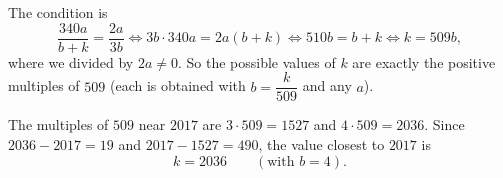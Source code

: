 The condition is
\[
\dfrac{340a}{b+k}=\dfrac{2a}{3b}\iff 3b\cdot340a=2a(b+k)\iff 510b=b+k\iff k=509b,
\]
where we divided by $2a\ne0$. So the possible values of $k$ are exactly the positive multiples of $509$ (each is obtained with $b=\dfrac{k}{509}$ and any $a$).

The multiples of $509$ near $2017$ are $3\cdot509=1527$ and $4\cdot509=2036$. Since $2036-2017=19$ and $2017-1527=490$, the value closest to $2017$ is
\[
k=\boxed{2036}\qquad(\text{with }b=4).
\]

